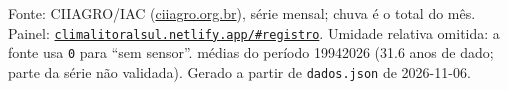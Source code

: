 \documentclass[10pt,a4paper]{article}
\begin{document}
\vspace{1pt}
{\tiny\color{cinza}
Fonte: CIIAGRO/IAC (\href{http://ciiagro.org.br}{ciiagro.org.br}), série mensal;
chuva é o total do mês. Painel:
\href{https://climalitoralsul.netlify.app/\#registro}%
{\texttt{climalitoralsul.netlify.app/\#registro}}.
Umidade relativa omitida: a fonte usa \texttt{0} para ``sem sensor''. 
médias do período 1994\textendash{}2026 (31.6 anos de dado; parte da série não validada).
Gerado a partir de \texttt{dados.json} de 2026-11-06.}
\end{document}
